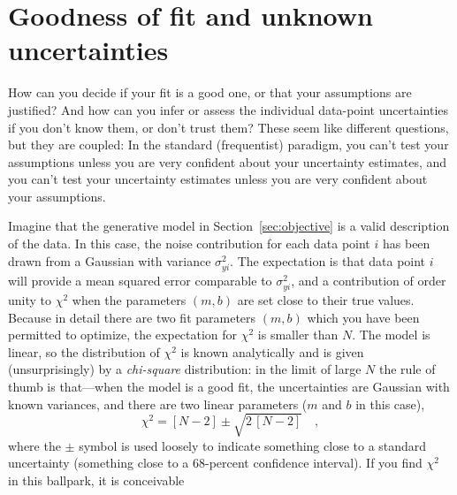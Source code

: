 \documentclass[12pt,twoside]{article}
\newcommand{\sectionname}{Section}
\begin{document}
\section{Goodness of fit and unknown uncertainties}\label{sec:goodness}

How can you decide if your fit is a good one, or that your assumptions
are justified?  And how can you infer or assess the individual
data-point uncertainties if you don't know them, or don't trust them?
These seem like different questions, but they are coupled: In the
standard (frequentist) paradigm, you can't test your assumptions
unless you are very confident about your uncertainty estimates, and
you can't test your uncertainty estimates unless you are very
confident about your assumptions.

Imagine that the generative model in \sectionname~\ref{sec:objective}
is a valid description of the data.  In this case, the noise
contribution for each data point $i$ has been drawn from a Gaussian
with variance $\sigma_{yi}^2$.  The expectation is that data point $i$
will provide a mean squared error comparable to $\sigma_{yi}^2$, and a
contribution of order unity to $\chi^2$ when the parameters $(m,b)$
are set close to their true values.  Because in detail there are two
fit parameters $(m,b)$ which you have been permitted to optimize, the
expectation for $\chi^2$ is smaller than $N$. The model is linear, so
the distribution of $\chi^2$ is known analytically and is given
(unsurprisingly) by a \emph{chi-square} distribution: in the limit of
large $N$ the rule of thumb is that---when the model is a good fit,
the uncertainties are Gaussian with known variances, and there are two
linear parameters ($m$ and $b$ in this case),
\begin{equation}
\chi^2 = [N-2] \pm \sqrt{2\,[N-2]} \quad ,
\end{equation}
where the $\pm$ symbol is used loosely to indicate something close to
a standard uncertainty (something close to a 68-percent confidence
interval).  If you find $\chi^2$ in this ballpark, it is conceivable
\end{document}
